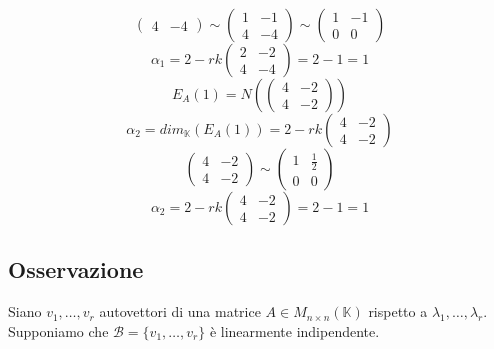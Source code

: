 \documentclass[a4paper]{article}
\theoremstyle{break}
\theoremstyle{break}
\theoremstyle{break}
\theoremstyle{break}
\begin{document}
\begin{example}
\begin{itemize}
\[\begin{pmatrix}
        4 & -4
      \end{pmatrix} 
      \sim
      \begin{pmatrix} 
        1 & -1\\
        4 & -4
      \end{pmatrix} 
      \sim \begin{pmatrix} 
        1 & -1\\
        0 & 0
      \end{pmatrix} 
      \] 
      \[
      \alpha_1 = 2 - rk \begin{pmatrix} 
        2 & -2\\
        4 & -4
      \end{pmatrix} 
      = 2 - 1 = 1
      \] 
      \vspace{1em}
      \[
        E_A(1) = N \left( \begin{pmatrix} 
            4 & -2\\
            4 & -2
        \end{pmatrix}  \right)
      \] 
      \[
        \alpha_2 = dim_{\mathbb{K}}(E_A(1)) = 2 - rk \begin{pmatrix} 
          4 & -2\\
          4 & -2
        \end{pmatrix}
      \] 
      \[
      \begin{pmatrix} 
        4 & -2\\
        4 & -2
      \end{pmatrix} 
      \sim
      \begin{pmatrix} 
        1 & \frac{1}{2}\\
        0 & 0
      \end{pmatrix} 
      \] 
      \[
      \alpha_2 = 2 - rk \begin{pmatrix} 
        4 & -2\\
        4 & -2
      \end{pmatrix}
      = 2 - 1 = 1
      \] 
  \end{itemize}
\end{example}

\subsection{Osservazione}
\label{9.7}
Siano \( v_1, \ldots, v_r \) autovettori di una matrice \( A \in M_{n \times n}(\mathbb{K}) \)
rispetto a \( \lambda_1, \ldots, \lambda_r \). Supponiamo che \( \mathcal{B} = \{v_1, \ldots, v_r\}  \)  
è linearmente indipendente.
\end{document}
